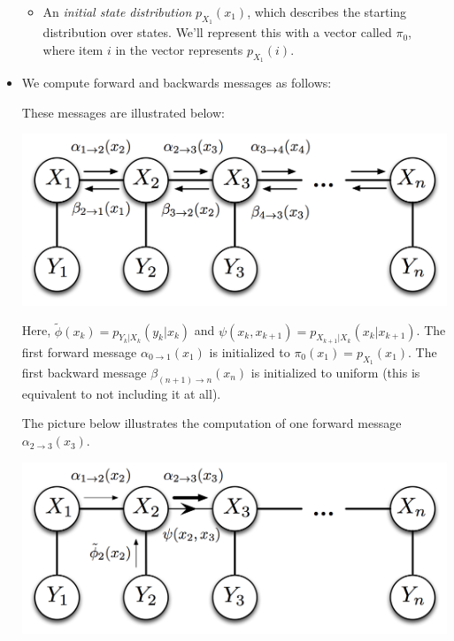 \documentclass[6008notes.tex]{subfiles}
\begin{document}
\begin{itemize}
\begin{itemize}
\item An \textit{initial state distribution} $p_{X_1}(x_1)$, which describes the starting distribution over states. We'll represent this with a vector called $\pi_0$, where item $i$ in the vector represents $p_{X_1}(i)$.
\end{itemize}

\item We compute forward and backwards messages as follows:

{ \par}

These messages are illustrated below:

{\centering\includegraphics[scale=0.4]{images_sec-graphical-models-hmm-messages} \par}

Here, $\tilde{\phi }(x_ k) = p_{Y_ k|X_ k}(y_ k|x_ k)$ and $\psi (x_ k, x_{k+1}) = p_{X_{k+1}|X_ k}(x_ k|x_{k+1})$. The first forward message $\alpha _{0 \to 1}(x_1)$ is initialized to $\pi _0(x_1) = p_{X_1}(x_1)$. The first backward message $\beta _{(n+1)\to n}(x_ n)$ is initialized to uniform (this is equivalent to not including it at all).

The picture below illustrates the computation of one forward message $\alpha _{2 \to 3}(x_3)$.

{\centering\includegraphics[scale=0.4]{images_sec-graphical-models-hmm-forward-message} \par}


\end{itemize}
\end{document}
